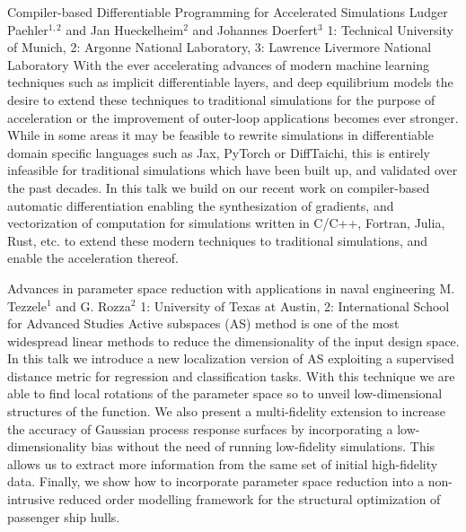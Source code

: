 \begin{addmargin}[2em]{0em}
\vspace{1.5ex}
\abs
{Compiler-based Differentiable Programming for Accelerated Simulations}
{Ludger Paehler$^{1,2}$ and Jan Hueckelheim$^{2}$ and Johannes Doerfert$^{3}$}
{1: Technical University of Munich, 2: Argonne National Laboratory, 3: Lawrence Livermore National Laboratory}
{With the ever accelerating advances of modern machine learning techniques such as implicit differentiable layers, and deep equilibrium models the desire to extend these techniques to traditional simulations for the purpose of acceleration or the improvement of outer-loop applications becomes ever stronger. While in some areas it may be feasible to rewrite simulations in differentiable domain specific languages such as Jax, PyTorch or DiffTaichi, this is entirely infeasible for traditional simulations which have been built up, and validated over the past decades. In this talk we build on our recent work on compiler-based automatic differentiation enabling the synthesization of gradients, and vectorization of computation for simulations written in C/C++, Fortran, Julia, Rust, etc. to extend these modern techniques to traditional simulations, and enable the acceleration thereof.}


\vspace{1.5ex}
\abs
{Advances in parameter space reduction with applications in naval engineering}
{M. Tezzele$^{1}$ and G. Rozza$^{2}$}
{1: University of Texas at Austin, 2: International School for Advanced Studies}
{Active subspaces (AS) method is one of the most widespread linear methods to reduce the dimensionality of the input design space. In this talk we introduce a new localization version of AS exploiting a supervised distance metric for regression and classification tasks. With this technique we are able to find local rotations of the parameter space so to unveil low-dimensional structures of the function. We also present a multi-fidelity extension to increase the accuracy of Gaussian process response surfaces by incorporating a low-dimensionality bias without the need of running low-fidelity simulations. This allows us to extract more information from the same set of initial high-fidelity data. Finally, we show how to incorporate parameter space reduction into a non-intrusive reduced order modelling framework for the structural optimization of passenger ship hulls.}
\end{addmargin}


